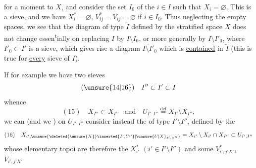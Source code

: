  for a moment to $X$, and
consider the set  $I_0$ of the $i\in I$ such that
$X_i=\varnothing$. This is a sieve, and we have
$X_i^*=\varnothing$, $V_{ij}^*=V_{ij}=\varnothing$ if $i\in I_0$. Thus neglecting
the empty spaces, we see that the diagram
of type $\widetilde I$ defined by the stratified space $X$
does not change essen\textsuperscript{t}ially on replacing $I$ by
$I\setminus I_0$, or more generally by $I\setminus I'_0$, where $I'_0\subset I'$
is a sieve,
which gives rise  a diagram
$\widetilde{I\setminus I'_0}$ which is \uline{contained} in $\widetilde I$ (this is
true for \uline{every} sieve of $I$).

If for example we have two sieves
\[
(\unsure{14|16})\quad I''\subset I'\subset I
\]
whence
\[
(15)\quad X_{I''}\subset X_{I'}\quad\text{and}\quad U_{I',I''}\overset{\mathrm{def}}{=}X_{I'}\setminus X_{I''},
\]
we can  (and we ) on $U_{I',I''}$ consider
instead the   of type $I'\setminus I''$,
defined by the 
\[
(16)\quad X_{i',\unsure{\deleted{\unsure{X}}\inserted{I',U''}|\unsure{U|X}_{I',U''}}}=X_{i'}\setminus X_{i'}\cap X_{I''}\subset U_{I',I''}
\]
whose elementary topoi are therefore the
$X_{i'}^*$ $(i'\in I'\setminus I'')$ and some $V^*_{i',j'X'}$, $V_{i',j'X'}$

